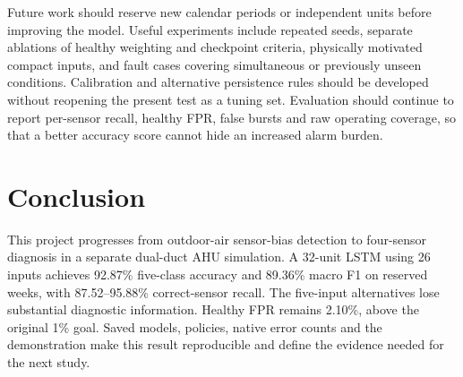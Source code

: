 Future work should reserve new calendar periods or independent units before improving the model. Useful experiments include repeated seeds, separate ablations of healthy weighting and checkpoint criteria, physically motivated compact inputs, and fault cases covering simultaneous or previously unseen conditions. Calibration and alternative persistence rules should be developed without reopening the present test as a tuning set. Evaluation should continue to report per-sensor recall, healthy FPR, false bursts and raw operating coverage, so that a better accuracy score cannot hide an increased alarm burden.

\section{Conclusion}
This project progresses from outdoor-air sensor-bias detection to four-sensor diagnosis in a separate dual-duct AHU simulation. A 32-unit LSTM using 26 inputs achieves 92.87\% five-class accuracy and 89.36\% macro F1 on reserved weeks, with 87.52--95.88\% correct-sensor recall. The five-input alternatives lose substantial diagnostic information. Healthy FPR remains 2.10\%, above the original 1\% goal. Saved models, policies, native error counts and the demonstration make this result reproducible and define the evidence needed for the next study.
